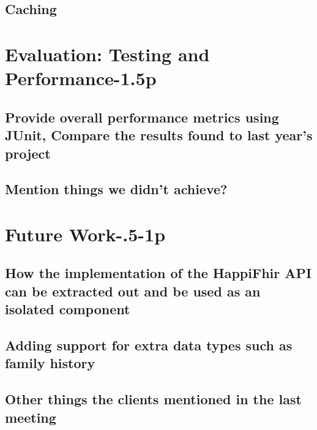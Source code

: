 \documentclass[sigconf]{acmart}
\begin{document}
\subsection{Caching}

\section{Evaluation: Testing and Performance-1.5p} 
\subsection{Provide overall performance metrics using JUnit, Compare the results found to last year's project}
\subsection{Mention things we didn't achieve?}

\section{Future Work-.5-1p} 
\subsection{How the implementation of the HappiFhir API can be extracted out and be used as an isolated component}
\subsection{Adding support for extra data types such as family history}
\subsection{Other things the clients mentioned in the last meeting}

 
\end{document}
